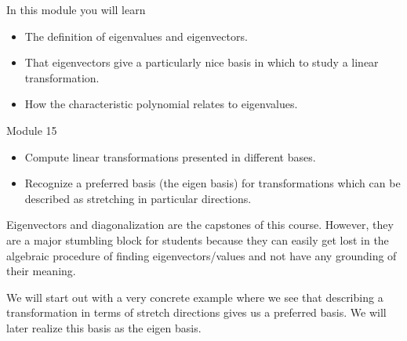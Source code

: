 \begin{module}

	In this module you will learn
	\begin{itemize}
		\item The definition of eigenvalues and eigenvectors.
		\item That eigenvectors give a particularly nice basis in which to study a linear transformation.
		\item How the characteristic polynomial relates to eigenvalues.
	\end{itemize}

	
	
\end{module}
\begin{lesson}

	Module 15

	\begin{itemize}
		\item Compute linear transformations presented in different bases.
		\item Recognize a preferred basis (the eigen basis) for transformations
			which can be described as stretching in particular directions.
	\end{itemize}

	Eigenvectors and diagonalization are the capstones of this course. However,
	they are a major stumbling block for students because they can easily get lost in
	the algebraic procedure of finding eigenvectors/values and not have any grounding
	of their meaning.

	We will start out with a very concrete example where we see that
	describing a transformation in terms of stretch directions gives us a preferred basis.
	We will later realize this basis as the eigen basis.

\end{lesson}
